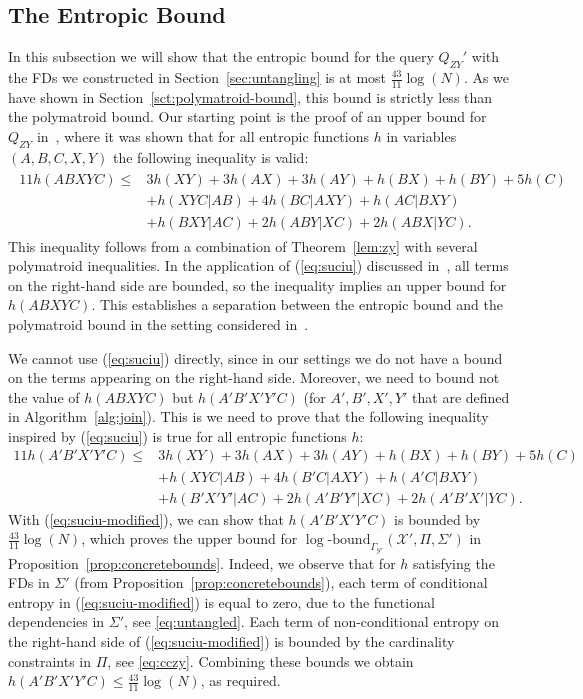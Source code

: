 \documentclass[a4paper,cleveref]{lipics-v2021}
\newcommand{\logb}{\mathrm{\log\text{-}bound}}
\newcommand{\vset}[1]{\mathcal{#1}}
\begin{document}
\subsection{The Entropic Bound}\label{sct:entropicbound}

In this subsection we will show that the entropic bound for the query $Q_{ZY}'$ with the FDs we constructed in Section~\ref{sec:untangling} is at most $\frac{43}{11}\log(N)$.
As we have shown in Section~\ref{sct:polymatroid-bound}, this bound is strictly less than the polymatroid bound. Our starting point is the proof of an upper bound for $Q_{ZY}$ in~\cite{Khamis0S17,Suciu23},
where it was shown that for all entropic functions $h$ in variables $(A,B,C,X,Y)$ the following inequality is valid:
\begin{align}
	\begin{split}
	11 h(ABXYC) \le &3 h(XY) + 3h(AX) + 3h(AY) +h(BX) + h(BY) + 5h(C) \\
	& + h(XYC|AB) + 4h(BC|AXY) + h(AC|BXY) \\&+ h(BXY|AC)+ 2h(ABY|XC) + 2h(ABX|YC).
	\end{split}\tag{*}\label{eq:suciu}
\end{align}
This inequality follows from a combination of Theorem~\ref{lem:zy} with several polymatroid inequalities. 
In the application of (\ref{eq:suciu}) discussed in~\cite{Khamis0S17,Suciu23}, all terms on the right-hand side are bounded,
so the inequality implies an upper bound for $h(ABXYC)$.
This establishes a separation between the entropic bound and the polymatroid bound in the setting considered in~\cite{Khamis0S17,Suciu23}.

We cannot use  (\ref{eq:suciu}) directly, since in our settings we do not have a bound on the terms appearing on the right-hand side. 
Moreover, we need to bound not the value of $h(ABXYC)$ but  $h(A'B'X'Y'C)$ 
(for $A',B',X',Y'$ that are defined in Algorithm~\ref{alg:join}).
%
This is we need to prove that the following inequality inspired by (\ref{eq:suciu}) is true for all entropic functions $h$:
\begin{align*}
	11 h(A'B'X'Y'C) \le &3 h(XY) + 3h(AX) + 3h(AY) +h(BX) + h(BY) + 5h(C) \\
	& + h(XYC|AB) + 4h(B'C|AXY) + h(A'C|BXY) \\
	&+ h(B'X'Y'|AC)+ 2h(A'B'Y'|XC) + 2h(A'B'X'|YC).\tag{**}\label{eq:suciu-modified}
\end{align*}
With (\ref{eq:suciu-modified}), we can show that $h(A'B'X'Y'C)$ is bounded by $\frac{43}{11}\log(N)$,
which proves the upper bound for $\logb_{\Gamma_{\vset Y'}}(\vset X', \Pi, \Sigma')$  in Proposition~\ref{prop:concretebounds}.
Indeed, we observe that for $h$ satisfying the FDs in $\Sigma'$ (from  Proposition~\ref{prop:concretebounds}),
each term of conditional entropy in (\ref{eq:suciu-modified})  is equal to zero, due to the  functional dependencies in $\Sigma'$, see \eqref{eq:untangled}.
Each term of  non-conditional entropy on the right-hand side of (\ref{eq:suciu-modified}) is bounded by the cardinality constraints in $\Pi$, see \eqref{eq:cczy}. 
Combining these bounds we obtain $h(A'B'X'Y'C) \le \frac{43}{11}\log(N)$, as required.
\end{document}
